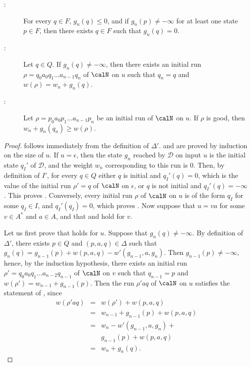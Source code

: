 \documentclass[a4paper]{article}
\begin{document}
\begin{description}
	\item[:] For every $q \in F$, $g_n(q) \leq 0$, and if $g_n(p)
		\neq - \infty$ for at least one state $p \in F$, then there
		exists $q \in F$ such that $g_n(q) = 0$.
	\item[:] Let $q \in Q$.  If $g_n(q) \neq - \infty$, then there
		exists an initial run $\rho = q_0 a_0 q_1 \ldots a_{n-1} q_n$ of
		$\calN$ on $u$ such that $q_n = q$ and $w(\rho) = w_n + g_n(q)$.
	\item[:] Let $\rho = p_0 a_0 p_1 \ldots a_{n-1}p_n$ be an
		initial run of $\calN$ on $u$.  If $\rho$ is good, then $w_n +
		g_n(q_n) \geq w(\rho)$.
\end{description}

\begin{proof}
	 follows immediately from the definition of $\Delta'$.  
	and  are proved by induction on the size of $u$.  If $u =
	\epsilon$, then the state $g_n$ reached by $\mathcal{D}$ on input $u$ is
	the initial state $q_I'$ of $\mathcal{D}$, and the weight $w_n$
	corresponding to this run is $0$.  Then, by definition of $I'$, for
	every $q \in Q$ either $q$ is initial and $q_I'(q) = 0$, which is the
	value of the initial run $\rho' = q$ of $\calN$ on $\epsilon$, or $q$
	is not initial and $q_I'(q) = - \infty$. This proves .
	Conversely, every initial run $\rho$ of $\calN$ on $u$ is of the form
	$q_I$ for some $q_I \in I$, and $q_I'(q_I) = 0$, which proves .
	Now suppose that $u = va$ for some $v \in A^*$ and $a \in A$, and that
	 and  hold for $v$.

	Let us first prove that  holds for $u$.  Suppose that $g_n(q)
	\neq - \infty$.  By definition of $\Delta'$, there exists $p \in Q$ and
	$(p,a,q) \in \Delta$ such that $g_n(q) = g_{n-1}(p) + w(p,a,q) -
	w'(g_{n-1},a,g_n)$.  Then $g_{n-1}(p) \neq - \infty$, hence, by the
	induction hypothesis, there exists an initial run $\rho' = q_0 a_0 q_1
	\ldots a_{n-2}q_{n-1}$ of $\calN$ on $v$ such that $q_{n-1} = p$ and
	$w(\rho') = w_{n-1} + g_{n-1}(p)$.  Then the run $\rho' a q$ of $\calN$
	on $u$ satisfies the statement of , since
	\[
	\begin{array}{lll}
	w(\rho' a q) & = & w(\rho') + w(p,a,q)\\
	& = & w_{n-1} + g_{n-1}(p) + w(p,a,q)\\
	& = & w_n - w'(g_{n-1},a,g_n) + { }\\
	&   & g_{n-1}(p) + w(p,a,q)\\
	& = & w_n + g_n(q).
	\end{array}
	\]


\end{proof}
\end{document}
